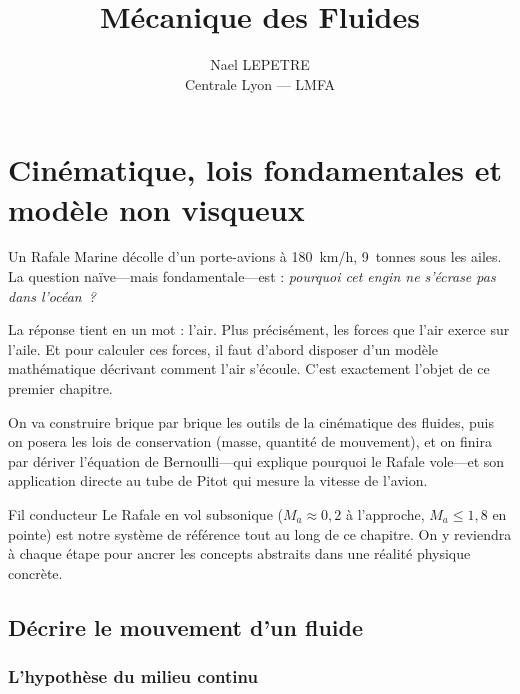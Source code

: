 \documentclass[11pt,a4paper]{report}
\begin{document}

\title{\Huge\bfseries Mécanique des Fluides}
\author{\Large Nael LEPETRE \\ \small Centrale Lyon --- LMFA}
\date{\the\year}
\maketitle

\tableofcontents
\newpage

\chapter{Cinématique, lois fondamentales et modèle non visqueux}

Un Rafale Marine décolle d'un porte-avions à 180~km/h, 9~tonnes sous les ailes.
La question naïve---mais fondamentale---est : \textit{pourquoi cet engin ne s'écrase
pas dans l'océan~?}

La réponse tient en un mot : l'air. Plus précisément, les forces que l'air exerce
sur l'aile. Et pour calculer ces forces, il faut d'abord disposer d'un modèle
mathématique décrivant comment l'air s'écoule. C'est exactement l'objet de ce
premier chapitre.

On va construire brique par brique les outils de la cinématique des fluides, puis
on posera les lois de conservation (masse, quantité de mouvement), et on finira
par dériver l'équation de Bernoulli---qui explique pourquoi le Rafale vole---et son
application directe au tube de Pitot qui mesure la vitesse de l'avion.

\begin{defbox}{Fil conducteur}
Le Rafale en vol subsonique ($M_a \approx 0{,}2$ à l'approche, $M_a \leq 1{,}8$
en pointe) est notre système de référence tout au long de ce chapitre. On y reviendra
à chaque étape pour ancrer les concepts abstraits dans une réalité physique concrète.
\end{defbox}

\section{Décrire le mouvement d'un fluide}

\subsection{L'hypothèse du milieu continu}
\end{document}
